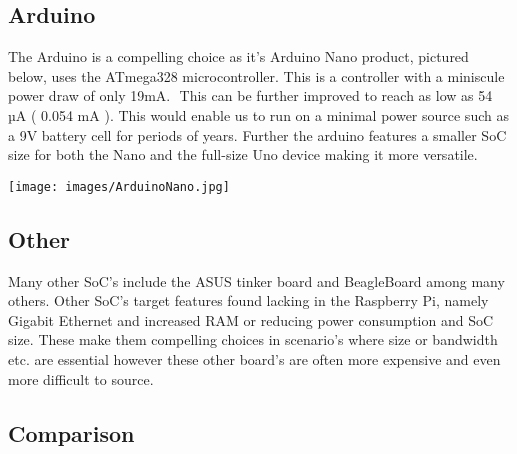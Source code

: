 \subsection{Arduino}
The Arduino is a compelling choice as it’s Arduino Nano product, pictured below, uses the ATmega328 microcontroller. This is a controller with a miniscule power draw of only 19mA. \citep{ArduinoLLC2010}⁠ This can be further improved to reach as low as 54 µA ( 0.054 mA ). This would enable us to run on a minimal power source such as a 9V battery cell for periods of years. \citep{Madcoffee2018} Further the arduino features a smaller SoC size for both the Nano and the full-size Uno device \citep{ArduinoLLC2010} making it more versatile.

\texttt{[image: images/ArduinoNano.jpg]}\\\citep{Mellis2010}


\subsection{Other}
Many other SoC’s include the ASUS tinker board and BeagleBoard among many others. Other SoC's target features found lacking in the Raspberry Pi, namely Gigabit Ethernet and increased RAM or reducing power consumption and SoC size. These make them compelling choices in scenario's where size or bandwidth etc. are essential however these other board's are often more expensive and even more difficult to source.

\subsection{Comparison}

